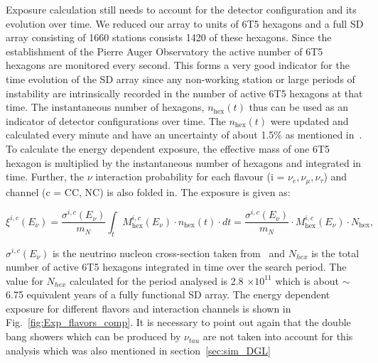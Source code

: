 Exposure calculation still needs to account for the detector configuration and its evolution over time. We reduced our array to units of 6T5 hexagons and a full SD array consisting of 1660 stations consists 1420 of these hexagons. Since the establishment of the Pierre Auger Observatory the active number of 6T5 hexagons are monitored every second. This forms a very good indicator for the time evolution of the SD array since any non-working station or large periods of instability are intrinsically recorded in the number of active 6T5 hexagons at that time. The instantaneous number of hexagons, $n_{\text{hex}}(t)$ thus can be used as an indicator of detector configurations over time. The $n_{\text{hex}}(t)$ were updated and calculated every minute and have an uncertainty of about 1.5\% as mentioned in~\cite{PierreAuger:2010zof}. To calculate the energy dependent exposure, the effective mass of one 6T5 hexagon is multiplied by the instantaneous number of hexagons and integrated in time. Further, the $\nu$ interaction probability for each flavour (i = $\nu_e, \nu_{\mu}, \nu_{\tau}$) and channel (c = CC, NC) is also folded in. The exposure is given as:

\begin{equation}
  \xi^{i,c}(E_{\nu}) = \frac{\sigma^{i,c}(E_{\nu})}{m_N} \int_{t} M_{\text{hex}}^{i,c}(E_{\nu}) \cdot n_{\text{hex}}(t) \cdot dt =  \frac{\sigma^{i,c}(E_{\nu})}{m_N} \cdot M_{\text{hex}}^{i,c}(E_{\nu}) \cdot N_{\text{hex}},
\end{equation}

$\sigma^{i,c}(E_{\nu})$ is the neutrino nucleon cross-section taken from~\cite{Cooper-Sarkar:2011jtt} and $N_{hex}$ is the total number of active 6T5 hexagons integrated in time over the search period. The value for $N_{hex}$ calculated for the period analysed is 2.8 $\times 10^{11}$ which is about $\sim$6.75 equivalent years of a fully functional SD array. The energy dependent exposure for different flavors and interaction channels is shown in Fig.~\ref{fig:Exp_flavors_comp}. It is necessary to point out again that the double bang showers which can be produced by $\nu_{tau}$ are not taken into account for this analysis which was also mentioned in section~\ref{sec:sim_DGL} 

